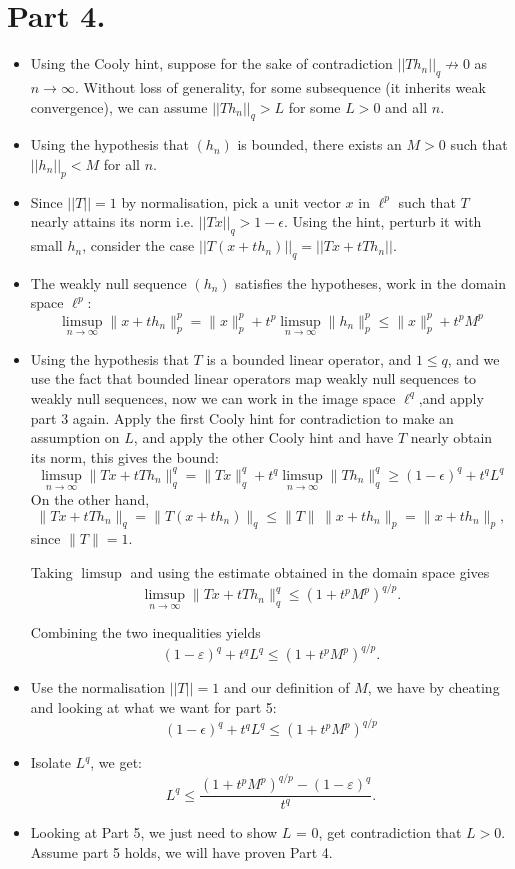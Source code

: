 \documentclass[10pt]{article}
\begin{document}
\section*{Part 4.}

\begin{itemize}
    \item Using the Cooly hint, suppose for the sake of contradiction $||T h_n||_q \not\to 0$ as $n \to \infty$. Without loss of generality, for some subsequence (it inherits weak convergence), we can assume $||T h_n||_q > L$ for some $L > 0$ and all $n$.
    \item Using the hypothesis that $(h_n)$ is bounded, there exists an $M > 0$ such that $||h_n||_p < M$ for all $n$.
    \item Since $||T|| = 1$ by normalisation, pick a unit vector $x$ in $\ell^p$ such that $T$ nearly attains its norm i.e. $||T x||_q > 1 - \epsilon$. Using the hint, perturb it with small $h_n$, consider the case $||T(x+th_n)||_q = ||Tx + t T h_n||$.
    \item The weakly null sequence $(h_n)$ satisfies the hypotheses, work in the domain space $\ell^p$:
    \[
    \limsup_{n \to \infty} \|x + t h_n\|_p^p = \|x\|_p^p + t^p \limsup_{n \to \infty} \|h_n\|_p^p \leq \|x\|_p^p + t^p M^p
    \]
    \item Using the hypothesis that $T$ is a bounded linear operator, and $1 \leq q$, and we use the fact that bounded linear operators map weakly null sequences to weakly null sequences, now we can work in the image space $\ell^q$,and apply part 3 again. Apply the first Cooly hint for contradiction to make an assumption on $L$, and apply the other Cooly hint and have $T$ nearly obtain its norm, this gives the bound:
    \[
    \limsup_{n \to \infty} \|T x + t T h_n\|_q^q = \|Tx\|_q^q + t^q \limsup_{n \to \infty} \|Th_n\|_q^q \geq 
    (1 - \epsilon)^q + t^q L^q
    \] 
    On the other hand,
    \[
    \|Tx+tTh_n\|_q
    =
    \|T(x+th_n)\|_q
    \le
    \|T\|\,\|x+th_n\|_p
    =
    \|x+th_n\|_p,
    \]
    since $\|T\|=1$.

    Taking $\limsup$ and using the estimate obtained in the domain space gives
    \[
    \limsup_{n\to\infty}\|Tx+tTh_n\|_q^q
    \le
    \left(
    1+t^pM^p
    \right)^{q/p}.
    \]

    Combining the two inequalities yields
    \[
    (1-\varepsilon)^q+t^qL^q
    \le
    (1+t^pM^p)^{q/p}.
    \]
    \item Use the normalisation $||T|| = 1$ and our definition of $M$, we have by cheating and looking at what we want for part 5:
    \[
        (1 - \epsilon)^q + t^q L^q \leq (1 + t^p M^p)^{q/p}
    \]
    \item Isolate $L^q$, we get:
    \[
    L^q
    \le
        \frac{(1+t^pM^p)^{q/p}-(1-\varepsilon)^q}{t^q}.
     \]
    \item Looking at Part 5, we just need to show $L$ = 0, get contradiction that $L > 0$. Assume part 5 holds, we will have proven Part 4.
\end{itemize}
\end{document}
